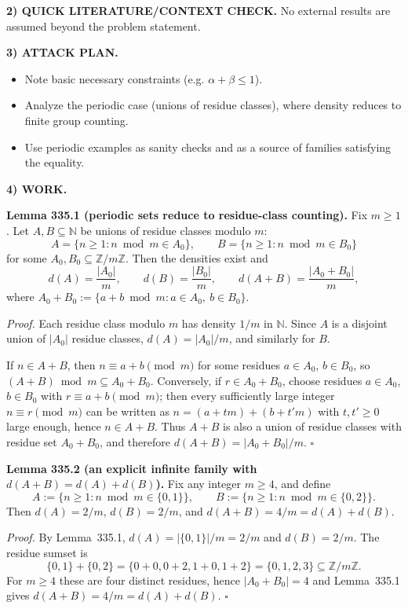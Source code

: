 \medskip
\noindent\textbf{2) QUICK LITERATURE/CONTEXT CHECK.}
No external results are assumed beyond the problem statement.

\medskip
\noindent\textbf{3) ATTACK PLAN.}
\begin{itemize}
\item Note basic necessary constraints (e.g. $\alpha+\beta\le 1$).
\item Analyze the periodic case (unions of residue classes), where density reduces to finite group counting.
\item Use periodic examples as sanity checks and as a source of families satisfying the equality.
\end{itemize}

\medskip
\noindent\textbf{4) WORK.}

\medskip
\noindent\textbf{Lemma 335.1 (periodic sets reduce to residue-class counting).}
Fix $m\ge 1$. Let $A,B\subseteq\mathbb{N}$ be unions of residue classes modulo $m$:
\[
 A=\{n\ge 1: n\bmod m\in A_0\},\qquad B=\{n\ge 1: n\bmod m\in B_0\}
\]
for some $A_0,B_0\subseteq\mathbb{Z}/m\mathbb{Z}$. Then the densities exist and
\[
 d(A)=\frac{|A_0|}{m},\qquad d(B)=\frac{|B_0|}{m},\qquad d(A+B)=\frac{|A_0+B_0|}{m},
\]
where $A_0+B_0:=\{a+b\bmod m: a\in A_0,\ b\in B_0\}$.

\noindent\emph{Proof.}
Each residue class modulo $m$ has density $1/m$ in $\mathbb{N}$. Since $A$ is a disjoint union of $|A_0|$ residue classes, $d(A)=|A_0|/m$, and similarly for $B$.

If $n\in A+B$, then $n\equiv a+b\pmod m$ for some residues $a\in A_0$, $b\in B_0$, so $(A+B)\bmod m\subseteq A_0+B_0$. Conversely, if $r\in A_0+B_0$, choose residues $a\in A_0$, $b\in B_0$ with $r\equiv a+b\pmod m$; then every sufficiently large integer $n\equiv r\pmod m$ can be written as $n=(a+tm)+(b+t'm)$ with $t,t'\ge 0$ large enough, hence $n\in A+B$. Thus $A+B$ is also a union of residue classes with residue set $A_0+B_0$, and therefore $d(A+B)=|A_0+B_0|/m$.
\hfill$\square$

\medskip
\noindent\textbf{Lemma 335.2 (an explicit infinite family with $d(A+B)=d(A)+d(B)$).}
Fix any integer $m\ge 4$, and define
\[
A:=\{n\ge 1: n\bmod m\in\{0,1\}\},\qquad
B:=\{n\ge 1: n\bmod m\in\{0,2\}\}.
\]
Then $d(A)=2/m$, $d(B)=2/m$, and $d(A+B)=4/m=d(A)+d(B)$.

\noindent\emph{Proof.}
By Lemma~335.1, $d(A)=|\{0,1\}|/m=2/m$ and $d(B)=2/m$. The residue sumset is
\[
\{0,1\}+\{0,2\}=\{0+0,0+2,1+0,1+2\}=\{0,1,2,3\}\subseteq\mathbb{Z}/m\mathbb{Z}.
\]
For $m\ge 4$ these are four distinct residues, hence $|A_0+B_0|=4$ and Lemma~335.1 gives
$d(A+B)=4/m=d(A)+d(B)$.
\hfill$\square$

